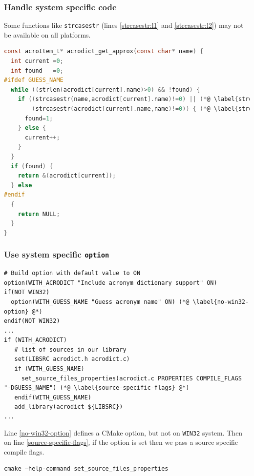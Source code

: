 \documentclass[compress,slidestop,table
              ]
               {beamer}
\begin{document}
\begin{frame}[fragile]
\frametitle{Handle system specific code}
Some functions like \lstinline[language=C]!strcasestr!
(lines \ref{strcasestr:l1} and \ref{strcasestr:l2}) may not be available
on all platforms.
\begin{lstlisting}[language=C,basicstyle=\tiny,xleftmargin=1cm,xrightmargin=1cm,caption=excerpt from acrodict.c]
const acroItem_t* acrodict_get_approx(const char* name) {
  int current =0;
  int found   =0;
#ifdef GUESS_NAME
  while ((strlen(acrodict[current].name)>0) && !found) {
    if ((strcasestr(name,acrodict[current].name)!=0) || (*@ \label{strcasestr:l1} @*)
        (strcasestr(acrodict[current].name,name)!=0)) { (*@ \label{strcasestr:l2} @*)
      found=1;
    } else {
      current++;
    }
  }
  if (found) {
    return &(acrodict[current]);
  } else
#endif
  {
    return NULL;
  }
}
\end{lstlisting}
\end{frame}

\begin{frame}[fragile]
\frametitle{Use system specific \lstinline!option!}
\begin{lstlisting}[basicstyle=\tiny]
# Build option with default value to ON
option(WITH_ACRODICT "Include acronym dictionary support" ON)
if(NOT WIN32)
  option(WITH_GUESS_NAME "Guess acronym name" ON) (*@ \label{no-win32-option} @*)
endif(NOT WIN32)
...
if (WITH_ACRODICT)
   # list of sources in our library
   set(LIBSRC acrodict.h acrodict.c)
   if (WITH_GUESS_NAME)
     set_source_files_properties(acrodict.c PROPERTIES COMPILE_FLAGS "-DGUESS_NAME") (*@ \label{source-specific-flags} @*)
   endif(WITH_GUESS_NAME)
   add_library(acrodict ${LIBSRC})
...
\end{lstlisting}
Line \ref{no-win32-option} defines a CMake option, but not on \lstinline!WIN32! system.
Then on line \ref{source-specific-flags}, if the option is set then we pass a source specific compile flags.

\texttt{cmake --help-command set\_source\_files\_properties}
\end{frame}
\end{document}

